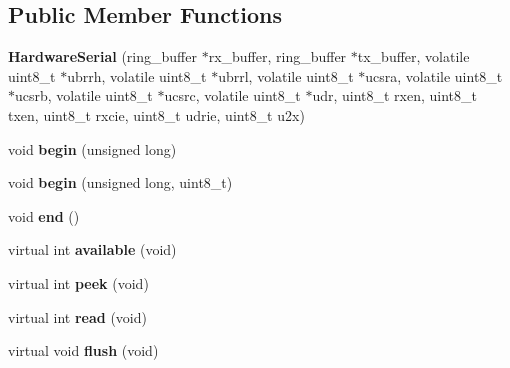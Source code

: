 \subsection*{Public Member Functions}
\begin{DoxyCompactItemize}
\item 
\hypertarget{class_hardware_serial_a3d8f7468f947b66a21394eafd3c2c643}{{\bfseries Hardware\-Serial} (ring\-\_\-buffer $\ast$rx\-\_\-buffer, ring\-\_\-buffer $\ast$tx\-\_\-buffer, volatile uint8\-\_\-t $\ast$ubrrh, volatile uint8\-\_\-t $\ast$ubrrl, volatile uint8\-\_\-t $\ast$ucsra, volatile uint8\-\_\-t $\ast$ucsrb, volatile uint8\-\_\-t $\ast$ucsrc, volatile uint8\-\_\-t $\ast$udr, uint8\-\_\-t rxen, uint8\-\_\-t txen, uint8\-\_\-t rxcie, uint8\-\_\-t udrie, uint8\-\_\-t u2x)}\label{class_hardware_serial_a3d8f7468f947b66a21394eafd3c2c643}

\item 
\hypertarget{class_hardware_serial_ad3fcb1f90c11e7939fcf5079e2d29b89}{void {\bfseries begin} (unsigned long)}\label{class_hardware_serial_ad3fcb1f90c11e7939fcf5079e2d29b89}

\item 
\hypertarget{class_hardware_serial_a6d7cd41eca940345e2ffad77cf08c3bc}{void {\bfseries begin} (unsigned long, uint8\-\_\-t)}\label{class_hardware_serial_a6d7cd41eca940345e2ffad77cf08c3bc}

\item 
\hypertarget{class_hardware_serial_aaf81d3fdaf258088d7692fa70cece087}{void {\bfseries end} ()}\label{class_hardware_serial_aaf81d3fdaf258088d7692fa70cece087}

\item 
\hypertarget{class_hardware_serial_aeec8f4dbef97221a6041d6cdc6e9b716}{virtual int {\bfseries available} (void)}\label{class_hardware_serial_aeec8f4dbef97221a6041d6cdc6e9b716}

\item 
\hypertarget{class_hardware_serial_a65e3a688fcd31f2f486d3af02c400d8f}{virtual int {\bfseries peek} (void)}\label{class_hardware_serial_a65e3a688fcd31f2f486d3af02c400d8f}

\item 
\hypertarget{class_hardware_serial_aead319e2866cf90d56c10f2ed39a4396}{virtual int {\bfseries read} (void)}\label{class_hardware_serial_aead319e2866cf90d56c10f2ed39a4396}

\item 
\hypertarget{class_hardware_serial_a0a4efd3d0f68d057f23eb5dfcd16c17c}{virtual void {\bfseries flush} (void)}\label{class_hardware_serial_a0a4efd3d0f68d057f23eb5dfcd16c17c}


\end{DoxyCompactItemize}
